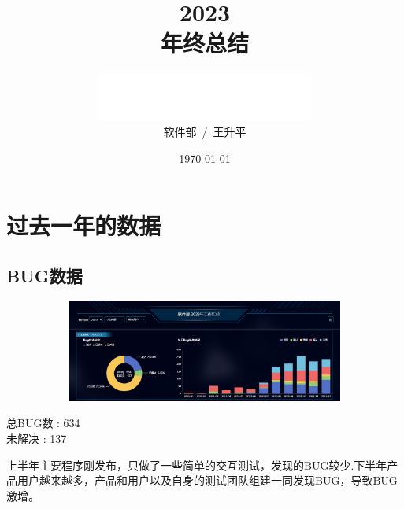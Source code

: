 \documentclass[AutoFakeBold,AutoFakeSlant]{beamer}
\title{\textbf{2023}\\年终总结}
\date{\today}
\author{\includegraphics[width=0.26\linewidth]{logo}\\软件部~/~王升平}
\begin{document}
	\maketitle
	
	\section{过去一年的数据}
	\subsection{BUG数据}
	
	\begin{frame}[fragile]
		\begin{figure}
			\centering %
			\begin{subfigure}{\linewidth}
				\includegraphics[width=\linewidth]{bug}
			\end{subfigure}
		\end{figure} 
		
		\begin{minipage}[l]{0.3\linewidth}
			\large
			总BUG数 : 634 \\
			未解决  : 137
		\end{minipage}\hfill
		\begin{minipage}[l]{0.6\linewidth}
			\footnotesize
			上半年主要程序刚发布，只做了一些简单的交互测试，发现的BUG较少.下半年产品用户越来越多，产品和用户以及自身的测试团队组建一同发现BUG，导致BUG激增。
		\end{minipage}
	\end{frame}
	
	
\end{document}
